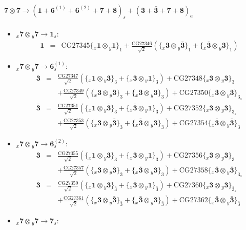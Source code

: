 \documentclass[english]{article}
\newcommand{\rep}[1]{\mathbf{#1}}
\newcommand{\repx}[2]{{}_{#2}\mathbf{#1}}
\newcommand{\subcg}[3]{\big\{ \repx{#1}{x}\otimes\repx{#2}{y}\big\}^{}_{#3}}
\begin{document}
\paragraph*{\Large $\rep{7}\otimes\rep{7}\to\left(\rep{1}+\rep{6}^{(1)}+\rep{6}^{(2)}+\rep{7}+\rep{8}\right)_s+\left(\rep{3}+\rep{\bar{3}}+\rep{7}+\rep{8}\right)_a$}
\begin{itemize}
\item $\repx{7}{x}\otimes\repx{7}{y}\to\rep{1}_{s}$:
\begin{eqnarray*}
\rep{1} &=& \text{CG27345}\subcg{1}{1}{1}+\frac{\text{CG27346}}{\sqrt{2}}\left(\subcg{3}{\bar{3}}{1}+\subcg{\bar{3}}{3}{1}\right)
\end{eqnarray*}
\item $\repx{7}{x}\otimes\repx{7}{y}\to\rep{6}_{s}^{(1)}$:
\begin{eqnarray*}
\rep{3} &=& \frac{\text{CG27347}}{\sqrt{2}}\left(\subcg{1}{3}{3}+\subcg{3}{1}{3}\right)+\text{CG27348}\subcg{3}{3}{3} \\ 
 & & +\frac{\text{CG27349}}{\sqrt{2}}\left(\subcg{3}{\bar{3}}{3}+\subcg{\bar{3}}{3}{3}\right)+\text{CG27350}\subcg{\bar{3}}{\bar{3}}{3_{s}}
\\
\rep{\bar{3}} &=& \frac{\text{CG27351}}{\sqrt{2}}\left(\subcg{1}{\bar{3}}{\bar{3}}+\subcg{\bar{3}}{1}{\bar{3}}\right)+\text{CG27352}\subcg{3}{3}{\bar{3}_{s}} \\ 
 & & +\frac{\text{CG27353}}{\sqrt{2}}\left(\subcg{3}{\bar{3}}{\bar{3}}+\subcg{\bar{3}}{3}{\bar{3}}\right)+\text{CG27354}\subcg{\bar{3}}{\bar{3}}{\bar{3}}
\end{eqnarray*}
\item $\repx{7}{x}\otimes\repx{7}{y}\to\rep{6}_{s}^{(2)}$:
\begin{eqnarray*}
\rep{3} &=& \frac{\text{CG27355}}{\sqrt{2}}\left(\subcg{1}{3}{3}+\subcg{3}{1}{3}\right)+\text{CG27356}\subcg{3}{3}{3} \\ 
 & & +\frac{\text{CG27357}}{\sqrt{2}}\left(\subcg{3}{\bar{3}}{3}+\subcg{\bar{3}}{3}{3}\right)+\text{CG27358}\subcg{\bar{3}}{\bar{3}}{3_{s}}
\\
\rep{\bar{3}} &=& \frac{\text{CG27359}}{\sqrt{2}}\left(\subcg{1}{\bar{3}}{\bar{3}}+\subcg{\bar{3}}{1}{\bar{3}}\right)+\text{CG27360}\subcg{3}{3}{\bar{3}_{s}} \\ 
 & & +\frac{\text{CG27361}}{\sqrt{2}}\left(\subcg{3}{\bar{3}}{\bar{3}}+\subcg{\bar{3}}{3}{\bar{3}}\right)+\text{CG27362}\subcg{\bar{3}}{\bar{3}}{\bar{3}}
\end{eqnarray*}
\item $\repx{7}{x}\otimes\repx{7}{y}\to\rep{7}_{s}$:

\end{itemize}
\end{document}
